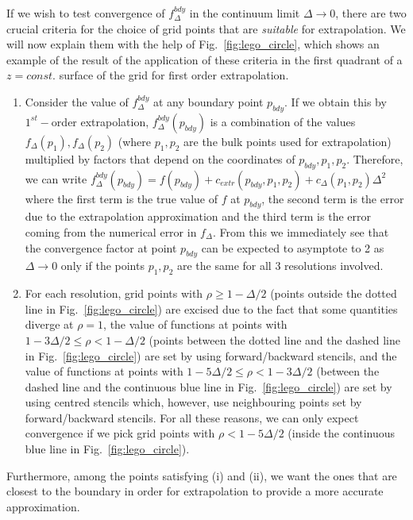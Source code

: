 \documentclass[12pt]{iopart} %
\begin{document}
If we wish to test convergence of $f^{bdy}_{\Delta}$ in the continuum limit $\Delta\rightarrow0$, there are two crucial criteria for the choice of grid points that are \emph{suitable} for extrapolation. We will now explain them with the help of Fig.~\ref{fig:lego_circle}, which shows an example of the result of the application of these criteria in the first quadrant of a $z=const.$ surface of the grid for first order extrapolation.
\begin{enumerate}
 \item Consider the value of $f^{bdy}_{\Delta}$ at any boundary point $p_{bdy}$. If we obtain this by $1^{st}-$order extrapolation, $f^{bdy}_{\Delta}(p_{bdy})$ is a combination of the values $f_\Delta(p_1),f_\Delta(p_2)$ (where $p_1,p_2$ are the bulk points used for extrapolation) multiplied by factors that depend on the coordinates of $p_{bdy},p_1,p_2$. Therefore, we can write  $f^{bdy}_{\Delta}(p_{bdy})=f(p_{bdy})+c_{extr}(p_{bdy},p_1,p_2)+c_\Delta(p_1,p_2)\Delta^2$ where the first term is the true value of $f$ at $p_{bdy}$, the second term is the error due to the extrapolation approximation and the third term is the error coming from the numerical error in $f_\Delta$. From this we immediately see that the convergence factor  at point $p_{bdy}$ can be expected to asymptote to 2 as $\Delta\rightarrow0$ only if the points $p_1,p_2$ are the same for all 3 resolutions involved.
 
 
\item For each resolution, grid points with $\rho\geq 1-\Delta/2$ (points outside the dotted line in Fig.~\ref{fig:lego_circle}) are excised due to the fact that some quantities diverge at $\rho=1$, the value of functions at points with $1-3\Delta/2\leq \rho < 1-\Delta/2$ (points between the dotted line and the dashed line in Fig.~\ref{fig:lego_circle}) are set by using forward/backward stencils, and the value of functions at points with $1-5\Delta/2\leq \rho < 1-3\Delta/2$ (between the dashed line and the continuous blue line in Fig.~\ref{fig:lego_circle}) are set by using centred stencils which, however, use neighbouring points set by forward/backward stencils. For all these reasons, we can only expect convergence if we pick grid points with  $\rho<1-5\Delta/2$ (inside the continuous blue line in Fig.~\ref{fig:lego_circle}).
 \end{enumerate}
Furthermore, among the points satisfying (i) and (ii), we want the ones that are closest to the boundary in order for extrapolation to provide a more accurate approximation.
\end{document}
